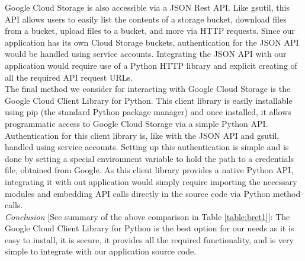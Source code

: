 \documentclass[10pt, onecolumn, draftclsnofoot, letterpaper, compsoc]{IEEEtran}
\begin{document}
Google Cloud Storage is also accessible via a JSON Rest API. Like gsutil, this API 
allows users to easily list the contents of a storage bucket, download files from 
a bucket, upload files to a bucket, and more via HTTP requests\cite{cloudStorageJSON}.
Since our application has its own Cloud Storage buckets, authentication for the
JSON API would be handled using service accounts\cite{cloudStorageJSON}. Integrating 
the JSON API with our application would require use of a Python HTTP library and explicit creating
of all the required API request URLs\cite{cloudStorageJSON}. \\

The final method we consider for interacting with Google Cloud Storage is the
Google Cloud Client Library for Python. This client library is easily
installable using pip (the standard Python package manager) and once installed,
it allows programmatic access to Google Cloud Storage via a simple Python
API\cite{cloudStorageLib}. Authentication for this client library is, like with 
the JSON API and gsutil, handled using service accounts\cite{cloudStorageLib}. 
Setting up this authentication is simple and is done by setting a special 
environment variable to hold the path to a credentials file, obtained from 
Google\cite{cloudStorageLib}. As this client library provides a native Python 
API, integrating it with out application would simply require importing the 
necessary modules and embedding API calls directly in the source code via 
Python method calls\cite{cloudStorageLib}. \\

\textit{Conclusion} [See summary of the above comparison in Table \ref{table:bret1}]:
The Google Cloud Client Library for Python is the best
option for our needs as it is easy to install, it is secure, it provides all the
required functionality, and is very simple to integrate with our application 
source code. \\
\end{document}
